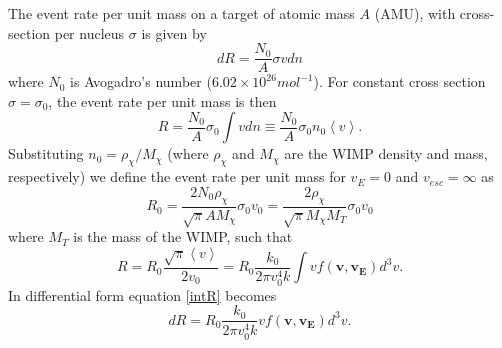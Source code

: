 \documentclass[a4paper,12pt]{article}
\begin{document}
The event rate per unit mass on a target of atomic mass $A$ (AMU), with cross-section per nucleus $\sigma$ is given by
\begin{equation}
dR=\frac{N_0}{A} \sigma v dn
\end{equation}
where $N_0$ is Avogadro's number ($6.02\times10^{26} mol^{-1}$).  For constant cross section $\sigma=\sigma_0$, the event rate per unit mass is then
\begin{equation}
R=\frac{N_0}{A}\sigma_0 \int v dn \equiv \frac{N_0}{A}\sigma_0n_0\left\langle v\right\rangle .
\end{equation}
Substituting $n_0=\rho_{\chi} / M_{\chi}$ (where $\rho_{\chi}$ and $M_{\chi}$ are the WIMP density and mass, respectively) we define the event rate per unit mass for $v_E=0$ and $v_{esc}=\infty$ as
\begin{equation} \label{R-not}
R_0=\frac{2 N_0 \rho_{\chi}}{\sqrt{\pi} A M_{\chi}} \sigma_0 v_0 = \frac{2 \rho_{\chi} }{\sqrt{\pi} M_{\chi} M_T} \sigma_0 v_0
\end{equation}
where $M_T$ is the mass of the WIMP, such that 
\begin{equation} \label{intR}
R=R_0 \frac{\sqrt{\pi} \left \langle v \right \rangle}{2 v_0} = R_0 \frac{k_0}{2 \pi v_0^4 k} \int v f(\mathbf{v},\mathbf{v_E}) d^3v.
\end{equation}
In differential form equation \ref{intR} becomes
\begin{equation} \label{diffR}
dR = R_0 \frac{k_0}{2 \pi v_0^4 k} v f(\mathbf{v},\mathbf{v_E}) d^3v.
\end{equation}
\end{document}
